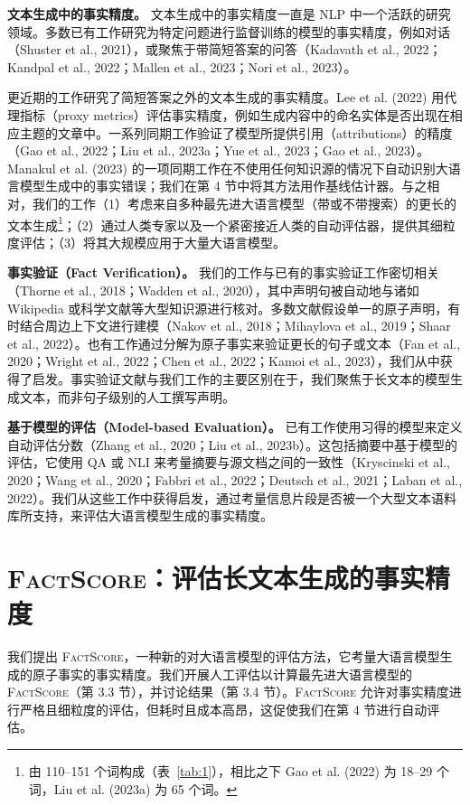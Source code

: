 \documentclass[11pt,UTF8,fontset=fandol]{ctexart}
\newcommand{\FS}{\textsc{FactScore}}
\begin{document}
\textbf{文本生成中的事实精度。} 文本生成中的事实精度一直是 NLP 中一个活跃的研究领域。多数已有工作研究为特定问题进行监督训练的模型的事实精度，例如对话（Shuster et al., 2021），或聚焦于带简短答案的问答（Kadavath et al., 2022；Kandpal et al., 2022；Mallen et al., 2023；Nori et al., 2023）。

更近期的工作研究了简短答案之外的文本生成的事实精度。Lee et al. (2022) 用代理指标（proxy metrics）评估事实精度，例如生成内容中的命名实体是否出现在相应主题的文章中。一系列同期工作验证了模型所提供引用（attributions）的精度（Gao et al., 2022；Liu et al., 2023a；Yue et al., 2023；Gao et al., 2023）。Manakul et al. (2023) 的一项同期工作在不使用任何知识源的情况下自动识别大语言模型生成中的事实错误；我们在第 4 节中将其方法用作基线估计器。与之相对，我们的工作（1）考虑来自多种最先进大语言模型（带或不带搜索）的更长的文本生成\footnote{由 110--151 个词构成（表~\ref{tab:1}），相比之下 Gao et al. (2022) 为 18--29 个词，Liu et al. (2023a) 为 65 个词。}；（2）通过人类专家以及一个紧密接近人类的自动评估器，提供其细粒度评估；（3）将其大规模应用于大量大语言模型。

\textbf{事实验证（Fact Verification）。} 我们的工作与已有的事实验证工作密切相关（Thorne et al., 2018；Wadden et al., 2020），其中声明句被自动地与诸如 Wikipedia 或科学文献等大型知识源进行核对。多数文献假设单一的原子声明，有时结合周边上下文进行建模（Nakov et al., 2018；Mihaylova et al., 2019；Shaar et al., 2022）。也有工作通过分解为原子事实来验证更长的句子或文本（Fan et al., 2020；Wright et al., 2022；Chen et al., 2022；Kamoi et al., 2023），我们从中获得了启发。事实验证文献与我们工作的主要区别在于，我们聚焦于长文本的模型生成文本，而非句子级别的人工撰写声明。

\textbf{基于模型的评估（Model-based Evaluation）。} 已有工作使用习得的模型来定义自动评估分数（Zhang et al., 2020；Liu et al., 2023b）。这包括摘要中基于模型的评估，它使用 QA 或 NLI 来考量摘要与源文档之间的一致性（Kryscinski et al., 2020；Wang et al., 2020；Fabbri et al., 2022；Deutsch et al., 2021；Laban et al., 2022）。我们从这些工作中获得启发，通过考量信息片段是否被一个大型文本语料库所支持，来评估大语言模型生成的事实精度。

\section{\FS：评估长文本生成的事实精度}

我们提出 \FS，一种新的对大语言模型的评估方法，它考量大语言模型生成的原子事实的事实精度。我们开展人工评估以计算最先进大语言模型的 \FS（第 3.3 节），并讨论结果（第 3.4 节）。\FS{} 允许对事实精度进行严格且细粒度的评估，但耗时且成本高昂，这促使我们在第 4 节进行自动评估。
\end{document}
